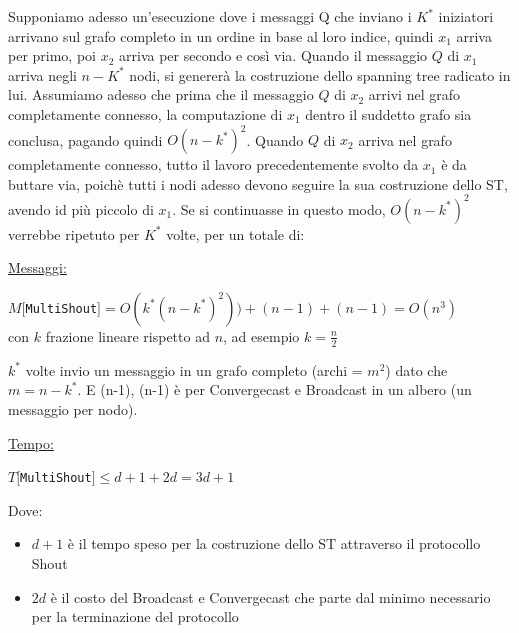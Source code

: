 Supponiamo adesso un'esecuzione dove i messaggi Q che inviano i $K^*$ iniziatori
arrivano sul grafo completo in un ordine in base al loro indice, quindi $x_1$
arriva per primo, poi $x_2$ arriva per secondo e così via. Quando il messaggio
$Q$ di $x_1$ arriva negli $n-K^*$ nodi, si genererà la costruzione dello
spanning tree radicato in lui. Assumiamo adesso che prima che il messaggio $Q$
di $x_2$ arrivi nel grafo completamente connesso, la computazione di $x_1$
dentro il suddetto grafo sia conclusa, pagando quindi $O(n-k^*)^2$. Quando $Q$
di $x_2$ arriva nel grafo completamente connesso, tutto il lavoro
precedentemente svolto da $x_1$ è da buttare via, poichè tutti i nodi adesso
devono seguire la sua costruzione dello ST, avendo id più piccolo di $x_1$. Se
si continuasse in questo modo, $O(n-k^*)^2$ verrebbe ripetuto per $K^*$ volte,
per un totale di:


\underline{Messaggi:}
\begin{center}
    $M[$\texttt{MultiShout}$] = O(k^*(n-k^*)^2)) + (n-1)+ (n-1) = O(n^3)$\\
    con $k$ frazione lineare rispetto ad $n$, ad esempio $k=\frac{n}{2}$
\end{center}
$k^*$ volte invio un messaggio in un grafo completo (archi = $m^2$) dato che
$m=n-k^*$. E (n-1), (n-1) è per Convergecast e Broadcast in un albero (un
messaggio per nodo).

\underline{Tempo:}
\begin{center}
    $T[$\texttt{MultiShout}$] \leq d + 1 + 2d = 3d + 1$
\end{center}
Dove:
\begin{itemize}
    \item  $d+1$ è il tempo speso per la costruzione dello ST attraverso il
          protocollo Shout
    \item $2d$ è il costo del Broadcast e Convergecast che parte dal minimo
          necessario per la terminazione del protocollo
\end{itemize}


